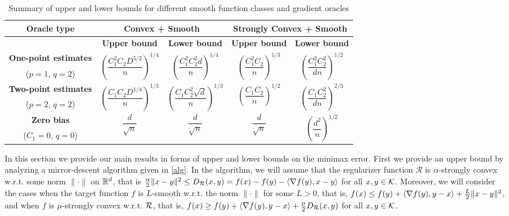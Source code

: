 \begin{table*}
\centering
 \caption{Summary of upper and lower bounds for different smooth function classes and  gradient oracles}
\label{tab:mse-1}
 \begin{tabular}{|c|c|c|c|c|}
\toprule
  \multirow{2}{*}{\textbf{Oracle type}} & \multicolumn{2}{c}{\multirow{2}{*}{\textbf{Convex + Smooth}}} & \multicolumn{2}{|c|}{\multirow{2}{*}{\textbf{Strongly Convex + Smooth}}} \\[1em]
 \midrule
 & \textbf{Upper bound} & \textbf{Lower bound} & \textbf{Upper bound} & \textbf{Lower bound}\\
 \midrule
\textbf{ One-point estimates} & \multirow{2}{*}{$\left(\dfrac{C_1^{2}C_2 D^{5/2}}{n}\right)^{1/4}$}  & \multirow{2}{*}{$\left(\dfrac{C_1^2 C_2^2 d}{n}\right)^{1/4}$}& \multirow{2}{*}{$\left(\dfrac{C_1^2 C_2}{n}\right)^{1/3}$}  & \multirow{2}{*}{$\left(\dfrac{C_1^2 C_2^2}{d n}\right)^{1/2}$} \\[0.5ex]
 ($p=1$, $q=2$) & & & &\\\midrule
\textbf{ Two-point estimates} & \multirow{2}{*}{$\left(\dfrac{C_1 C_2 D^{1/4}}{n}\right)^{1/3}$}  & \multirow{2}{*}{$\left(\dfrac{C_1 C_2^2 \sqrt d}{n}\right)^{1/3}$} & \multirow{2}{*}{$\left(\dfrac{C_1 C_2}{n}\right)^{1/2}$}  & \multirow{2}{*}{$\left(\dfrac{C_1 C_2^2 }{d n}\right)^{2/3}$}\\[1.4ex]
 ($p=2$, $q=2$) & & & &\\
  \midrule
 \textbf{Zero bias} & \multirow{2}{*}{$\dfrac{d}{\sqrt{n}}$}  & \multirow{2}{*}{$\dfrac{d}{\sqrt{n}}$} & \multirow{2}{*}{$\dfrac{d}{\sqrt{n}}$}  & \multirow{2}{*}{$\left(\dfrac{d^2}{n}\right)^{1/2}$}  \\[0.5ex]
 ($C_1=0$, $q=0$) & & & &\\\bottomrule
\end{tabular}
\end{table*}


In this section we provide our main results in forms of upper and lower bounds on the minimax error.
First we provide an upper bound by analyzing a mirror-descent algorithm given in \cref{alg}. In the algorithm, we will assume that the regularizer function $\mathcal{R}$ is $\alpha$-strongly convex w.r.t. some norm $\|\cdot\|$ on $\mathbb{R}^d$, that is $\tfrac{\alpha}{2} \|x-y\|^2 \le D_{\mathcal{R}}(x,y)=f(x)-f(y)-\langle \nabla f(y),x-y \rangle$ for all $x,y \in \mathcal{K}$. Moreover, we will consider the cases when the target function $f$ is $L$-smooth w.r.t. the norm $\| \cdot \|$ for some $L>0$, that is, $f(x) \le f(y) + \langle \nabla f(y), y-x \rangle + \tfrac{L}{2} \|x-y\|^2$, and when $f$ is $\mu$-strongly convex w.r.t. $\mathcal{R}$, that is, 
$f(x) \ge f(y) + \langle \nabla f(y),y-x \rangle +\tfrac{\mu}{2} D_{\mathcal{R}}(x,y)$ for all $x,y \in \mathcal{K}$.

